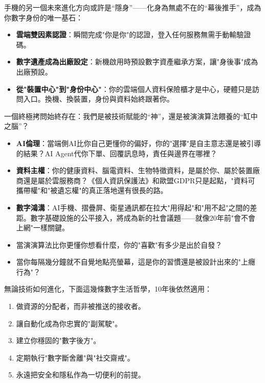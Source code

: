 手機的另一個未來進化方向或許是“隱身”——化身為無處不在的“幕後推手”，成為你數字身份的唯一基石：

\begin{itemize}
  \item \textbf{雲端雙因素認證}：瞬間完成"你是你"的認證，登入任何服務無需手動輸驗證碼。
  \item \textbf{數字遺產成為出廠設定}：新機啟用時預設數字資產繼承方案，讓"身後事"成為出廠預設。
  \item \textbf{從"裝置中心"到"身份中心"}：你的雲端個人資料保險櫃才是中心，硬體只是訪問入口。換機、換裝置，身份與資料始終跟著你。
\end{itemize}


一個終極拷問始終存在：我們是被技術賦能的“神”，還是被演演算法餵養的“缸中之腦”？

\begin{itemize}
  \item \textbf{AI倫理}：當端側AI比你自己更懂你的偏好，你的"選擇"是自主意志還是被引導的結果？AI Agent代你下單、回覆訊息時，責任與邊界在哪裡？
  \item \textbf{資料主權}：你的健康資料、腦電資料、生物特徵資料，是屬於你、屬於裝置廠商還是屬於雲服務商？《個人資訊保護法》和歐盟GDPR只是起點，"資料可攜帶權"和"被遺忘權"的真正落地還有很長的路。
  \item \textbf{數字鴻溝}：AI手機、摺疊屏、衛星通訊都在拉大"用得起"和"用不起"之間的差距。數字基礎設施的公平接入，將成為新的社會議題——就像20年前"會不會上網"一樣關鍵。
  \item 當演演算法比你更懂你想看什麼，你的"喜歡"有多少是出於自發？
  \item 當你每隔幾分鐘就不自覺地點亮螢幕，這是你的習慣還是被設計出來的"上癮行為"？
\end{itemize}


無論技術如何進化，下面這幾條數字生活哲學，10年後依然適用：

\begin{enumerate}
  \item 做資源的分配者，而非被推送的接收者。
  \item 讓自動化成為你忠實的"副駕駛"。
  \item 建立你穩固的"數字後方"。
  \item 定期執行"數字斷舍離"與"社交齋戒"。
  \item 永遠把安全和隱私作為一切便利的前提。
\end{enumerate}

